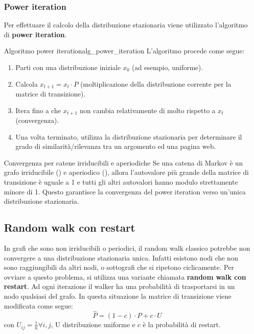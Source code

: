 \subsubsection{Power iteration}
Per effettuare il calcolo della distribuzione stazionaria viene utilizzato
l'algoritmo di \textbf{power iteration}.

\begin{definizione}{Algoritmo power iteration}{alg_power_iteration}
    L'algoritmo procede come segue:
    \begin{enumerate}
        \item Parti con una distribuzione iniziale $x_0$ (ad esempio, uniforme).
        \item Calcola $x_{t+1} = x_t \cdot P$ (moltiplicazione della
        distribuzione corrente per la matrice di transizione).
        \item Itera fino a che $x_{t+1}$ non cambia relativamente di
        molto rispetto a $x_t$ (convergenza).
        \item Una volta terminato, utilizza la distribuzione stazionaria per
        determinare il grado di similarità/rilevanza tra un argomento ed una
        pagina web.
    \end{enumerate}
\end{definizione}


\begin{teorema}{Convergenza per catene irriducibili e aperiodiche}{}
    Se una catena di Markov è un grafo irriducibile
    () e aperiodico (), allora
    l'autovalore più grande della matrice di transizione è uguale a 1 e tutti
    gli altri autovalori hanno modulo strettamente minore di 1. Questo
    garantisce la convergenza del power iteration verso un'unica
    distribuzione stazionaria.
\end{teorema}

\subsection{Random walk con restart}
In grafi che sono non irriducibili o periodici, il random walk classico
potrebbe non convergere a una distribuzione stazionaria unica.
Infatti esistono nodi che non sono raggiungibili da altri nodi, o
sottografi che si ripetono ciclicamente.
Per ovviare a questo problema, si utilizza una variante chiamata
\textbf{random walk con restart}.
Ad ogni iterazione il walker ha una probabilità di trasportarsi in un nodo
qualsiasi del grafo.
In questa situazione la matrice di transizione viene modificata come segue:
\[
\hat{P} = (1 - c) \cdot P + c \cdot U
\]
con $U_{ij} = \frac{1}{n}\forall i,j$, U distribuzione uniforme e $c$ è la
probabilità di restart.

